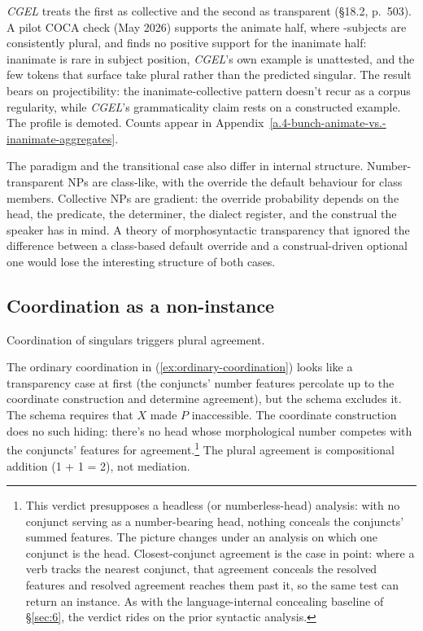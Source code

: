 \ea\label{ex:bunch-transition}
\ea {}
\ex {}
\z
\z

\textit{CGEL} treats the first as collective and the second as transparent (§18.2, p.~503). A pilot COCA check (May 2026) supports the animate half, where -subjects are consistently plural, and finds no positive support for the inanimate half: inanimate  is rare in subject position, \textit{CGEL}'s own example is unattested, and the few tokens that surface take plural rather than the predicted singular. The result bears on projectibility: the inanimate-collective pattern doesn't recur as a corpus regularity, while \textit{CGEL}'s grammaticality claim rests on a constructed example. The profile is demoted. Counts appear in Appendix~\ref{a.4-bunch-animate-vs.-inanimate-aggregates}.

The paradigm and the transitional case also differ in internal structure. Number-transparent NPs are class-like, with the override the default behaviour for class members. Collective NPs are gradient: the override probability depends on the head, the predicate, the determiner, the dialect register, and the construal the speaker has in mind. A theory of morphosyntactic transparency that ignored the difference between a class-based default override and a construal-driven optional one would lose the interesting structure of both cases.

\subsection{Coordination as a non-instance}\label{sec:2-3}

Coordination of singulars triggers plural agreement.

\ea\label{ex:ordinary-coordination}
\z

The ordinary coordination in (\ref{ex:ordinary-coordination}) looks like a transparency case at first (the conjuncts' number features percolate up to the coordinate construction and determine agreement), but the schema excludes it. The schema requires that $X$  made $P$ inaccessible. The coordinate construction does no such hiding: there's no head whose morphological number competes with the conjuncts' features for agreement.\footnote{This verdict presupposes a headless (or numberless-head) analysis: with no conjunct serving as a number-bearing head, nothing conceals the conjuncts' summed features. The picture changes under an analysis on which one conjunct is the head. Closest-conjunct agreement \autocite{bhatt-walkow-2013} is the case in point: where a verb tracks the nearest conjunct, that agreement conceals the resolved features and resolved agreement reaches them past it, so the same test can return an instance. As with the language-internal concealing baseline of §\ref{sec:6}, the verdict rides on the prior syntactic analysis.} The plural agreement is compositional addition (1 + 1 = 2), not mediation.

